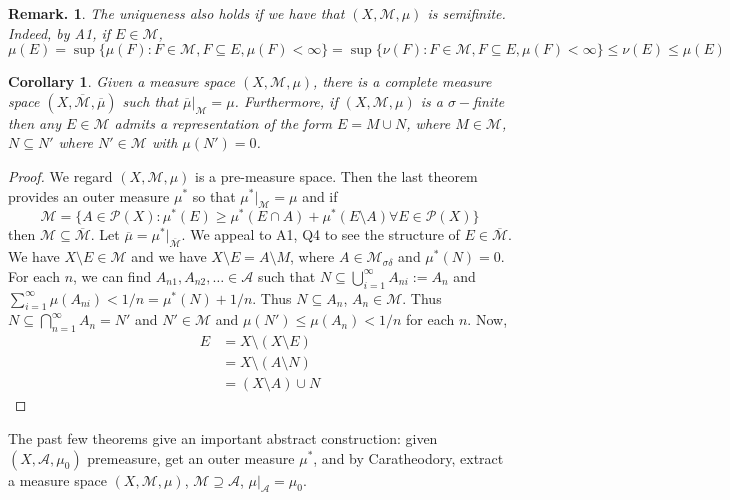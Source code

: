 \documentclass[12pt, a4paper]{memoir}
\newtheorem{corollary}[theorem]{Corollary}
\theoremstyle{nonumberplain}
\newtheorem{remark}{Remark.}
\newtheorem{proof}{Proof}
\begin{document}
\begin{remark}
    The uniqueness also holds if we have that $(X,\mathcal{M},\mu)$ is semifinite.
    Indeed, by A1, if $E\in\mathcal{M}$,
    \begin{equation*}\mu(E)=\sup\{\mu(F):F\in\mathcal{M},F\subseteq E,\mu(F)<\infty\}=\sup\{\nu(F):F\in\mathcal{M},F\subseteq E,\mu(F)<\infty\}\leq\nu(E)\leq\mu(E)\end{equation*}
\end{remark}
\begin{corollary}
    Given a measure space $(X,\mathcal{M},\mu)$, there is a complete measure space $(X,\overline{\mathcal{M}},\overline{\mu})$ such that $\overline{\mu}|_{\mathcal{M}}=\mu$.
    Furthermore, if $(X,\mathcal{M},\mu)$ is a $\sigma-$finite then any $E\in\mathcal{M}$ admits a representation of the form $E=M\cup N$, where $M\in\mathcal{M}$, $N\subseteq N'$ where $N'\in\mathcal{M}$ with $\mu(N')=0$.
\end{corollary}
\begin{proof}
    We regard $(X,\mathcal{M},\mu)$ is a pre-measure space.
    Then the last theorem provides an outer measure $\mu^*$ so that $\mu^*|_{\mathcal{M}}=\mu$ and if
    \begin{equation*}
        \mathcal{M}=\{A\in\mathcal{P}(X):\mu^*(E)\geq\mu^*(E\cap A)+\mu^*(E\setminus A)\forall E\in\mathcal{P}(X)\}
    \end{equation*}
    then $\mathcal{M}\subseteq\overline{\mathcal{M}}$.
    Let $\overline{\mu}=\mu^*|_{\overline{\mathcal{M}}}$.
    We appeal to A1, Q4 to see the structure of $E\in\overline{\mathcal{M}}$.
    We have $X\setminus E\in\mathcal{M}$ and we have $X\setminus E=A\setminus M$, where $A\in\mathcal{M}_{\sigma\delta}$ and $\mu^*(N)=0$.
    For each $n$, we can find $A_{n1},A_{n2},\ldots\in\mathcal{A}$ such that $N\subseteq\bigcup_{i=1}^\infty A_{ni}:=A_n$ and $\sum_{i=1}^\infty \mu(A_{ni})<1/n=\mu^*(N)+1/n$.
    Thus $N\subseteq A_n$, $A_n\in\mathcal{M}$.
    Thus $N\subseteq\bigcap_{n=1}^\infty A_n=N'$ and $N'\in\mathcal{M}$ and $\mu(N')\leq\mu(A_n)<1/n$ for each $n$.
    Now,
    \begin{align*}
        E&=X\setminus(X\setminus E)\\
         &=X\setminus(A\setminus N)\\
         &=(X\setminus A)\cup N
    \end{align*}
\end{proof}
The past few theorems give an important abstract construction: given $(X,\mathcal{A},\mu_0)$ premeasure, get an outer measure $\mu^*$, and by Caratheodory, extract a measure space $(X,\mathcal{M},\mu)$, $\mathcal{M}\supseteq\mathcal{A}$, $\mu|_{\mathcal{A}}=\mu_0$.
\end{document}

